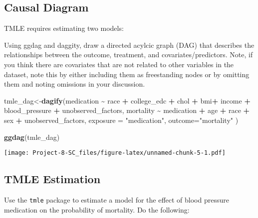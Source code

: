\documentclass[
]{article}
\newenvironment{Shaded}{\begin{snugshade}}{\end{snugshade}}
\newcommand{\AttributeTok}[1]{\textcolor[rgb]{0.13,0.29,0.53}{#1}}
\newcommand{\FunctionTok}[1]{\textcolor[rgb]{0.13,0.29,0.53}{\textbf{#1}}}
\newcommand{\NormalTok}[1]{#1}
\newcommand{\OtherTok}[1]{\textcolor[rgb]{0.56,0.35,0.01}{#1}}
\newcommand{\SpecialCharTok}[1]{\textcolor[rgb]{0.81,0.36,0.00}{\textbf{#1}}}
\newcommand{\StringTok}[1]{\textcolor[rgb]{0.31,0.60,0.02}{#1}}
\begin{document}
\subsection{Causal Diagram}\label{causal-diagram}

TMLE requires estimating two models:

Using ggdag and daggity, draw a directed acylcic graph (DAG) that
describes the relationships between the outcome, treatment, and
covariates/predictors. Note, if you think there are covariates that are
not related to other variables in the dataset, note this by either
including them as freestanding nodes or by omitting them and noting
omissions in your discussion.

\begin{Shaded}
\begin{Highlighting}[]
\NormalTok{tmle\_dag}\OtherTok{\textless{}{-}}\FunctionTok{dagify}\NormalTok{(medication }\SpecialCharTok{\textasciitilde{}}\NormalTok{ race }\SpecialCharTok{+}\NormalTok{ college\_edc }\SpecialCharTok{+}\NormalTok{ chol }\SpecialCharTok{+}\NormalTok{ bmi}\SpecialCharTok{+}\NormalTok{ income }\SpecialCharTok{+}\NormalTok{ blood\_pressure }\SpecialCharTok{+}\NormalTok{ unobserved\_factors,}
\NormalTok{                 mortality }\SpecialCharTok{\textasciitilde{}}\NormalTok{ medication }\SpecialCharTok{+}\NormalTok{ age }\SpecialCharTok{+}\NormalTok{ race }\SpecialCharTok{+}\NormalTok{ sex }\SpecialCharTok{+}\NormalTok{ unobserved\_factors,}
                 \AttributeTok{exposure =} \StringTok{"medication"}\NormalTok{,}
                 \AttributeTok{outcome=}\StringTok{"mortality"}
\NormalTok{)}

\FunctionTok{ggdag}\NormalTok{(tmle\_dag)}
\end{Highlighting}
\end{Shaded}

\texttt{[image: Project-8-SC\_files/figure-latex/unnamed-chunk-5-1.pdf]}

\subsection{TMLE Estimation}\label{tmle-estimation}

Use the \texttt{tmle} package to estimate a model for the effect of
blood pressure medication on the probability of mortality. Do the
following:
\end{document}
